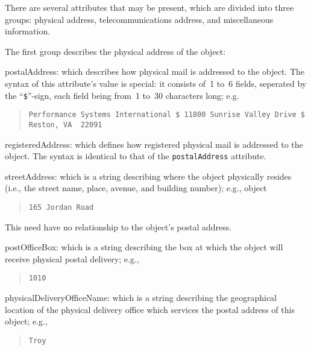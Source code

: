 There are several attributes that may be present,
which are divided into three groups:
physical address, telecommunications address, and miscellaneous information.

The first group describes the physical address of the object:
\begin{describe}
\item[postalAddress:]
			which describes how physical mail is addressed to the
			object.
			The syntax of this attribute's value is special:
			it consists of~1 to~6 fields, seperated by the
			``\verb"$"''-sign, each field being from~1 to~30
			characters long; e.g.
\begin{quote}\tiny\begin{verbatim}
Performance Systems International $ 11800 Sunrise Valley Drive $ Reston, VA  22091
\end{verbatim}\end{quote}

\item[registeredAddress:]
			which defines how registered physical mail is
			addressed to the object.
			The syntax is identical to that of the
			\verb"postalAddress" attribute.

\item[streetAddress:]
			which is a string describing where the object
			physically resides
			(i.e., the street name, place, avenue, and building
			number); e.g.,
			object
\begin{quote}\small\begin{verbatim}
165 Jordan Road
\end{verbatim}\end{quote}
			This need have no relationship to the object's
			postal address.

\item[postOfficeBox:]
			which is a string describing the box at which the
			object will receive physical postal delivery; e.g.,
\begin{quote}\small\begin{verbatim}
1010
\end{verbatim}\end{quote}

\item[physicalDeliveryOfficeName:]
			which is a string describing the geographical location
			of the physical delivery office which services the
			postal address of this object; e.g.,
\begin{quote}\small\begin{verbatim}
Troy
\end{verbatim}\end{quote}


\end{describe}
